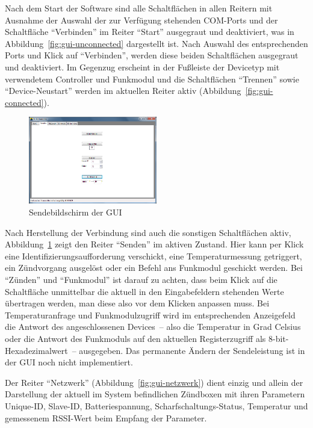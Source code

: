 \documentclass[paper=a4, parskip, numbers=noenddot, toc=listof, headsepline]{scrbook}
\begin{document}
				Nach dem Start der Software sind alle Schaltflächen in allen Reitern mit Ausnahme der Auswahl der zur Verfügung stehenden COM-Ports und der Schaltfläche \enquote{Verbinden} im Reiter \enquote{Start} ausgegraut und deaktiviert, was in Abbildung~\ref{fig:gui-unconnected} dargestellt ist. Nach Auswahl des entsprechenden Ports und Klick auf \enquote{Verbinden}, werden diese beiden Schaltflächen ausgegraut und deaktiviert. Im Gegenzug erscheint in der Fußleiste der Devicetyp mit verwendetem Controller und Funkmodul und die Schaltflächen \enquote{Trennen} sowie \enquote{Device-Neustart} werden im aktuellen Reiter aktiv (Abbildung~\ref{fig:gui-connected}).%
				\begin{figure}[!b]
					\centering
					\includegraphics[width=0.5\textwidth]{bilder/gui-senden}
					\caption{Sendebildschirm der GUI}
					\label{fig:gui-senden}
				\end{figure}

				Nach Herstellung der Verbindung sind auch die sonstigen Schaltflächen aktiv, Abbildung~\ref{fig:gui-senden} zeigt den Reiter \enquote{Senden} im aktiven Zustand. Hier kann per Klick eine Identifizierungsaufforderung verschickt, eine Temperaturmessung getriggert, ein Zündvorgang ausgelöst oder ein Befehl ans Funkmodul geschickt werden. Bei \enquote{Zünden} und \enquote{Funkmodul} ist darauf zu achten, dass beim Klick auf die Schaltfläche unmittelbar die aktuell in den Eingabefeldern stehenden Werte übertragen werden, man diese also vor dem Klicken anpassen muss. Bei Temperaturanfrage und Funkmodulzugriff wird im entsprechenden Anzeigefeld die Antwort des angeschlossenen Devices~-- also die Temperatur in Grad Celsius oder die Antwort des Funkmoduls auf den aktuellen Registerzugriff als 8-bit-Hexadezimalwert~-- ausgegeben. Das permanente Ändern der Sendeleistung ist in der GUI noch nicht implementiert.

				Der Reiter \enquote{Netzwerk} (Abbildung~\ref{fig:gui-netzwerk}) dient einzig und allein der Darstellung der aktuell im System befindlichen Zündboxen mit ihren Parametern Unique-ID, Slave-ID, Batteriespannung, Scharf\-schaltungs-Status, Temperatur und gemessenem RSSI-Wert beim Empfang der Parameter.
\end{document}
